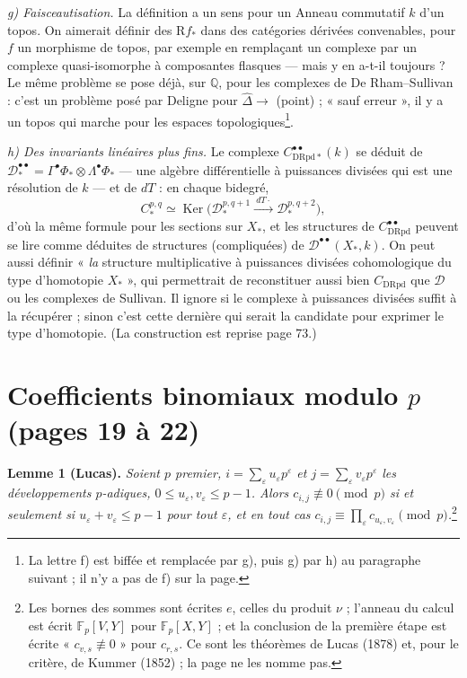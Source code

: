 \documentclass[11pt,a4paper]{article}
\begin{document}
\emph{g) Faisceautisation.} La définition a un sens pour un Anneau
commutatif $k$ d'un topos. On aimerait définir des $\mathrm{R}f_*$ dans des
catégories dérivées convenables, pour $f$ un morphisme de topos, par exemple en
remplaçant un complexe par un complexe quasi-isomorphe à composantes flasques —
mais y en a-t-il toujours ? Le même problème se pose déjà, sur $\mathbb{Q}$,
pour les complexes de De Rham–Sullivan : c'est un problème posé par Deligne
pour $\widehat{\Delta} \to$ (point) ; « sauf erreur », il y a un topos qui
marche pour les espaces topologiques\footnote{La lettre f) est biffée et
remplacée par g), puis g) par h) au paragraphe suivant ; il n'y a pas de f)
sur la page.}.

\emph{h) Des invariants linéaires plus fins.} Le complexe
$C^{\bullet\bullet}_{\mathrm{DRpd}*}(k)$ se déduit de
$\mathcal{D}^{\bullet\bullet}_* = \Gamma^\bullet \Phi_* \otimes
\Lambda^\bullet \Phi_*$ — une algèbre différentielle à puissances divisées qui
est une résolution de $k$ — et de $dT$ : en chaque bidegré,
\[
C^{p,q}_* \simeq \operatorname{Ker}\bigl(\mathcal{D}^{p,q+1}_* \xrightarrow{\ dT \cdot\ } \mathcal{D}^{p,q+2}_*\bigr) ,
\]
d'où la même formule pour les sections sur $X_*$, et les structures de
$C^{\bullet\bullet}_{\mathrm{DRpd}}$ peuvent se lire comme déduites de
structures (compliquées) de $\mathcal{D}^{\bullet\bullet}(X_*, k)$. On peut
aussi définir « \emph{la} structure multiplicative à puissances divisées
cohomologique du type d'homotopie $X_*$ », qui permettrait de reconstituer
aussi bien $C_{\mathrm{DRpd}}$ que $\mathcal{D}$ ou les complexes de
Sullivan. Il ignore si le complexe à puissances divisées suffit à la récupérer ;
sinon c'est cette dernière qui serait la candidate pour exprimer le type
d'homotopie. (La construction est reprise page 73.)

\section*{Coefficients binomiaux modulo $p$ (pages 19 à 22)}

\textbf{Lemme 1 (Lucas).} \emph{Soient $p$ premier, $i = \sum_\varepsilon
u_\varepsilon p^\varepsilon$ et $j = \sum_\varepsilon v_\varepsilon
p^\varepsilon$ les développements $p$-adiques, $0 \leq u_\varepsilon,
v_\varepsilon \leq p-1$. Alors $c_{i,j} \not\equiv 0 \pmod p$ si et seulement si
$u_\varepsilon + v_\varepsilon \leq p-1$ pour tout $\varepsilon$, et en tout
cas $c_{i,j} \equiv \prod_\varepsilon c_{u_\varepsilon, v_\varepsilon} \pmod
p$.}\footnote{Les bornes des sommes sont écrites $e$, celles du produit
$\nu$ ; l'anneau du calcul est écrit $\mathbb{F}_p[V,Y]$ pour
$\mathbb{F}_p[X,Y]$ ; et la conclusion de la première étape est écrite
« $c_{v,s} \not\equiv 0$ » pour $c_{r,s}$. Ce sont les théorèmes de Lucas (1878)
et, pour le critère, de Kummer (1852) ; la page ne les nomme pas.}
\end{document}
